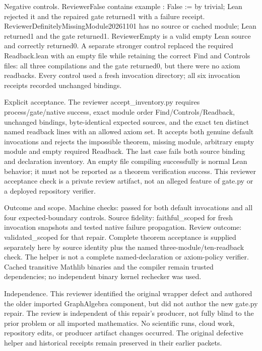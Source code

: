 \documentclass[10pt]{article}
\begin{document}
Negative controls. ReviewerFalse contains example : False := by trivial; Lean rejected it and the repaired gate returned1 with a failure receipt. ReviewerDefinitelyMissingModule20261101 has no source or cached module; Lean returned1 and the gate returned1. ReviewerEmpty is a valid empty Lean source and correctly returned0. A separate stronger control replaced the required Readback.lean with an empty file while retaining the correct Find and Controls files: all three compilations and the gate returned0, but there were no axiom readbacks. Every control used a fresh invocation directory; all six invocation receipts recorded unchanged bindings.\par\medskip
Explicit acceptance. The reviewer accept\_inventory.py requires process/gate/native success, exact module order Find/Controls/Readback, unchanged bindings, byte-identical expected sources, and the exact ten distinct named readback lines with an allowed axiom set. It accepts both genuine default invocations and rejects the impossible theorem, missing module, arbitrary empty module and empty required Readback. The last case fails both source binding and declaration inventory. An empty file compiling successfully is normal Lean behavior; it must not be reported as a theorem verification success. This reviewer acceptance check is a private review artifact, not an alleged feature of gate.py or a deployed repository verifier.\par\medskip
Outcome and scope. Machine checks: passed for both default invocations and all four expected-boundary controls. Source fidelity: faithful\_scoped for fresh invocation snapshots and tested native failure propagation. Review outcome: validated\_scoped for that repair. Complete theorem acceptance is supplied separately here by source identity plus the named three-module/ten-readback check. The helper is not a complete named-declaration or axiom-policy verifier. Cached transitive Mathlib binaries and the compiler remain trusted dependencies; no independent binary kernel rechecker was used.\par\medskip
Independence. This reviewer identified the original wrapper defect and authored the older imported GraphAlgebra component, but did not author the new gate.py repair. The review is independent of this repair's producer, not fully blind to the prior problem or all imported mathematics. No scientific runs, cloud work, repository edits, or producer artifact changes occurred. The original defective helper and historical receipts remain preserved in their earlier packets.\par\medskip
\end{document}
